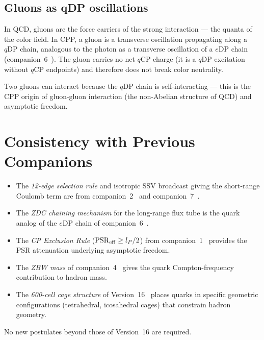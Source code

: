 \documentclass[12pt]{article}
\newcommand{\lP}{l_P}
\newcommand{\PSR}{\mathrm{PSR}}
\newcommand{\qCP}{q\mathrm{CP}}
\newcommand{\eDP}{e\mathrm{DP}}
\newcommand{\qDP}{q\mathrm{DP}}
\begin{document}
\subsection{Gluons as qDP oscillations}

In QCD, gluons are the force carriers of the strong interaction — the
quanta of the color field. In CPP, a gluon is a transverse oscillation
propagating along a $\qDP$ chain, analogous to the photon as a
transverse oscillation of a $\eDP$ chain (companion~6~\cite{c6}).
The gluon carries no net $\qCP$ charge (it is a $\qDP$ excitation
without $\qCP$ endpoints) and therefore does not break color neutrality.

Two gluons can interact because the $\qDP$ chain is self-interacting
— this is the CPP origin of gluon-gluon interaction (the non-Abelian
structure of QCD) and asymptotic freedom.

\section{Consistency with Previous Companions}
\label{sec:consistency}

\begin{itemize}[noitemsep]
\item The \emph{12-edge selection rule} and isotropic SSV broadcast
  giving the short-range Coulomb term are from companion~2~\cite{c2}
  and companion~7~\cite{c7}.
\item The \emph{ZDC chaining mechanism} for the long-range flux tube
  is the quark analog of the $\eDP$ chain of companion~6~\cite{c6}.
\item The \emph{CP Exclusion Rule} ($\PSR_{\rm eff} \geq \lP/2$)
  from companion~1~\cite{c1} provides the PSR attenuation underlying
  asymptotic freedom.
\item The \emph{ZBW mass} of companion~4~\cite{c4} gives the quark
  Compton-frequency contribution to hadron mass.
\item The \emph{600-cell cage structure} of Version~16~\cite{v16}
  places quarks in specific geometric configurations (tetrahedral,
  icosahedral cages) that constrain hadron geometry.
\end{itemize}

No new postulates beyond those of Version~16 are required.

\end{document}
